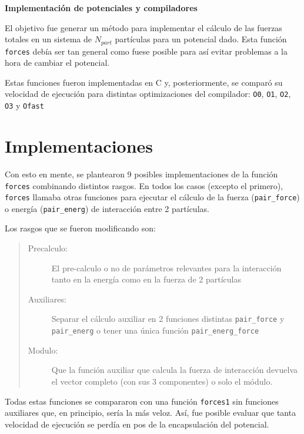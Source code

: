 \documentclass[twoside, 12pt]{article}
\begin{document}
\begin{center}
{\fontsize{20pt}{10pt}\textbf{Implementación de potenciales y compiladores}}
\end{center}

El objetivo fue generar un método para implementar el cálculo de las fuerzas totales en un sistema de $N_{part}$ partículas para un potencial dado. Esta función \texttt{forces} debía ser tan general como fuese posible para así evitar problemas a la hora de cambiar el potencial.

Estas funciones fueron implementadas en C y, posteriormente, se comparó su velocidad de ejecución para distintas optimizaciones del compilador: \texttt{O0}, \texttt{O1}, \texttt{O2}, \texttt{O3} y \texttt{Ofast}

\section{Implementaciones}
Con esto en mente, se plantearon 9 posibles implementaciones de la función \texttt{forces} combinando distintos rasgos. En todos los casos (excepto el primero), \texttt{forces} llamaba otras funciones para ejecutar el cálculo de la fuerza (\texttt{pair\_force}) o energía (\texttt{pair\_energ}) de interacción entre 2 partículas. 

Los rasgos que se fueron modificando son: 

\begin{quote}
\begin{description}
\item[Precalculo:] El pre-calculo o no de parámetros relevantes para la interacción tanto en la energía como en la fuerza de 2 partículas

\item[Auxiliares:] Separar el cálculo auxiliar en 2 funciones distintas \texttt{pair\_force} y \texttt{pair\_energ} o tener una única función \texttt{pair\_energ\_force}

\item[Modulo:] Que la función auxiliar que calcula la fuerza de interacción devuelva el vector completo (con sus 3 componentes) o solo el módulo.
\end{description}
\end{quote}

Todas estas funciones se compararon con una función \texttt{forces1} sin funciones auxiliares que, en principio, sería la más veloz. Así, fue posible evaluar que tanta velocidad de ejecución se perdía en pos de la encapsulación del potencial. 
\end{document}
